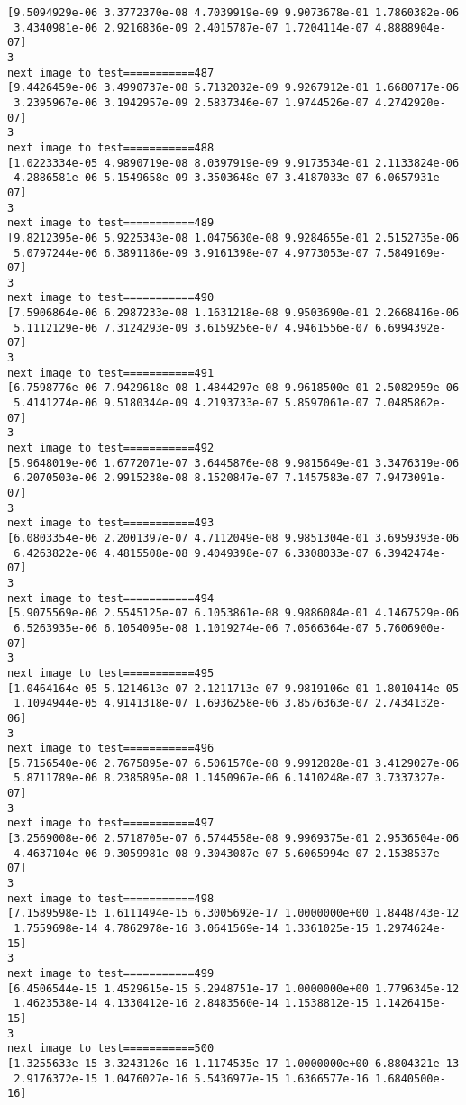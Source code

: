 \documentclass[11pt]{article}
\begin{document}
\begin{Verbatim}[commandchars=\\\{\}]
[9.5094929e-06 3.3772370e-08 4.7039919e-09 9.9073678e-01 1.7860382e-06
 3.4340981e-06 2.9216836e-09 2.4015787e-07 1.7204114e-07 4.8888904e-07]
3
next image to test===========487
[9.4426459e-06 3.4990737e-08 5.7132032e-09 9.9267912e-01 1.6680717e-06
 3.2395967e-06 3.1942957e-09 2.5837346e-07 1.9744526e-07 4.2742920e-07]
3
next image to test===========488
[1.0223334e-05 4.9890719e-08 8.0397919e-09 9.9173534e-01 2.1133824e-06
 4.2886581e-06 5.1549658e-09 3.3503648e-07 3.4187033e-07 6.0657931e-07]
3
next image to test===========489
[9.8212395e-06 5.9225343e-08 1.0475630e-08 9.9284655e-01 2.5152735e-06
 5.0797244e-06 6.3891186e-09 3.9161398e-07 4.9773053e-07 7.5849169e-07]
3
next image to test===========490
[7.5906864e-06 6.2987233e-08 1.1631218e-08 9.9503690e-01 2.2668416e-06
 5.1112129e-06 7.3124293e-09 3.6159256e-07 4.9461556e-07 6.6994392e-07]
3
next image to test===========491
[6.7598776e-06 7.9429618e-08 1.4844297e-08 9.9618500e-01 2.5082959e-06
 5.4141274e-06 9.5180344e-09 4.2193733e-07 5.8597061e-07 7.0485862e-07]
3
next image to test===========492
[5.9648019e-06 1.6772071e-07 3.6445876e-08 9.9815649e-01 3.3476319e-06
 6.2070503e-06 2.9915238e-08 8.1520847e-07 7.1457583e-07 7.9473091e-07]
3
next image to test===========493
[6.0803354e-06 2.2001397e-07 4.7112049e-08 9.9851304e-01 3.6959393e-06
 6.4263822e-06 4.4815508e-08 9.4049398e-07 6.3308033e-07 6.3942474e-07]
3
next image to test===========494
[5.9075569e-06 2.5545125e-07 6.1053861e-08 9.9886084e-01 4.1467529e-06
 6.5263935e-06 6.1054095e-08 1.1019274e-06 7.0566364e-07 5.7606900e-07]
3
next image to test===========495
[1.0464164e-05 5.1214613e-07 2.1211713e-07 9.9819106e-01 1.8010414e-05
 1.1094944e-05 4.9141318e-07 1.6936258e-06 3.8576363e-07 2.7434132e-06]
3
next image to test===========496
[5.7156540e-06 2.7675895e-07 6.5061570e-08 9.9912828e-01 3.4129027e-06
 5.8711789e-06 8.2385895e-08 1.1450967e-06 6.1410248e-07 3.7337327e-07]
3
next image to test===========497
[3.2569008e-06 2.5718705e-07 6.5744558e-08 9.9969375e-01 2.9536504e-06
 4.4637104e-06 9.3059981e-08 9.3043087e-07 5.6065994e-07 2.1538537e-07]
3
next image to test===========498
[7.1589598e-15 1.6111494e-15 6.3005692e-17 1.0000000e+00 1.8448743e-12
 1.7559698e-14 4.7862978e-16 3.0641569e-14 1.3361025e-15 1.2974624e-15]
3
next image to test===========499
[6.4506544e-15 1.4529615e-15 5.2948751e-17 1.0000000e+00 1.7796345e-12
 1.4623538e-14 4.1330412e-16 2.8483560e-14 1.1538812e-15 1.1426415e-15]
3
next image to test===========500
[1.3255633e-15 3.3243126e-16 1.1174535e-17 1.0000000e+00 6.8804321e-13
 2.9176372e-15 1.0476027e-16 5.5436977e-15 1.6366577e-16 1.6840500e-16]

\end{Verbatim}
\end{document}
